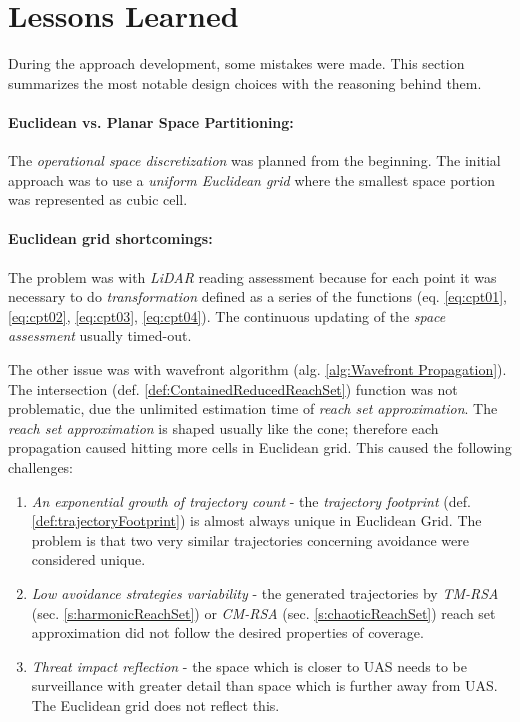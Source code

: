 \newpage
\section{Lessons Learned}\label{s:lessonsLearned}
\noindent During the approach development, some mistakes were made. This section summarizes the most notable design choices with the reasoning behind them.

\paragraph{Euclidean vs. Planar Space Partitioning:} The \emph{operational space discretization} was planned from the beginning. The initial approach was to use a \emph{uniform Euclidean  grid} where the smallest space portion was represented as cubic cell.

\paragraph{Euclidean grid shortcomings:} The problem was with \emph{LiDAR} reading assessment because for each point it was necessary to do \emph{transformation} defined as  a series of the functions (eq. \ref{eq:cpt01}, \ref{eq:cpt02}, \ref{eq:cpt03}, \ref{eq:cpt04}). The continuous updating of the \emph{space assessment} usually timed-out. 

The other issue was with wavefront algorithm (alg. \ref{alg:Wavefront Propagation}). The intersection (def. \ref{def:ContainedReducedReachSet}) function was not problematic, due the unlimited estimation time of \emph{reach set approximation}. The \emph{reach set approximation} is shaped usually like the cone; therefore each propagation caused hitting more cells in Euclidean  grid. This caused the following challenges:

\begin{enumerate}
    \item \emph{An exponential growth of trajectory count} - the \emph{trajectory footprint} (def. \ref{def:trajectoryFootprint}) is almost always unique in Euclidean Grid. The problem is that two very similar trajectories concerning avoidance were considered unique.
    
    \item \emph{Low avoidance strategies variability} - the generated trajectories by \emph{TM-RSA} (sec. \ref{s:harmonicReachSet}) or \emph{CM-RSA} (sec. \ref{s:chaoticReachSet}) reach set approximation did not follow the desired properties of coverage.
    
    \item \emph{Threat impact reflection} - the space which is closer to UAS needs to be surveillance with greater detail than space which is further away from UAS. The Euclidean grid does not reflect this.
\end{enumerate}


